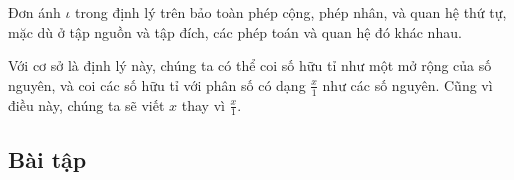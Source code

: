 Đơn ánh $\iota$ trong định lý trên bảo toàn phép cộng, phép nhân, và quan hệ thứ tự, mặc dù ở tập nguồn và tập đích, các phép toán và quan hệ đó khác nhau.

Với cơ sở là định lý này, chúng ta có thể coi số hữu tỉ như một mở rộng của số nguyên, và coi các số hữu tỉ với phân số có dạng $\frac{x}{1}$ như các số nguyên. Cũng vì điều này, chúng ta sẽ viết $x$ thay vì $\frac{x}{1}$.

\subsection{Bài tập}
